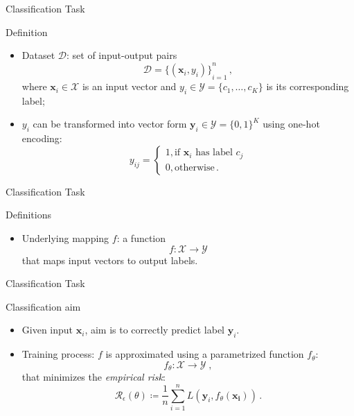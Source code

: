 \begin{frame}{Classification Task}
    \begin{definitionblock}{Definition}
        \centering
        \begin{itemize}
            \item<1-> Dataset $\mathcal{D}$: set of input-output pairs
            \[
                \mathcal{D} = {\{(\mathbf{x}_i, y_i)\}}_{i=1}^n\,,
            \]
            where $\mathbf{x}_i \in \mathcal{X}$ is an input vector and $y_i\in \mathcal{Y} = \{c_1, \dots, c_K\}$ is its corresponding label;
            \item<2-> $y_i$ can be transformed into vector form $\mathbf{y}_i\in \mathcal{Y} = {\{0,1\}}^K$ using one-hot encoding:
            \[
                y_{ij} = 
                \begin{cases}
                    1, \text{if $\mathbf{x}_i$ has label $c_j$}\\
                    0, \text{otherwise}\,.
                \end{cases}
            \]
        \end{itemize}
    \end{definitionblock}
\end{frame}

\begin{frame}{Classification Task}
    \begin{definitionblock}{Definitions}
        \centering
        \begin{itemize}
            \item<1-> Underlying mapping $f$: a function
            \[
                f:\mathcal{X} \to \mathcal{Y}
            \]
            that maps input vectors to output labels.
        \end{itemize}
    \end{definitionblock}
\end{frame}

\begin{frame}{Classification Task}
    \begin{normalblock}{Classification aim}
        \centering
        \begin{itemize}
            \item<1-> Given input $\mathbf{x}_i$, aim is to correctly predict label $\mathbf{y}_i$.
            \item<2-> Training process: $f$ is approximated using a parametrized function $f_{\theta}$:
            \[
                f_{\theta}: \mathcal{X} \to \mathcal{Y}\;,
            \]
            that minimizes the \emph{empirical risk}: 
            \[
                \mathcal{R}_{\epsilon}(\theta) \coloneqq \frac{1}{n}\sum_{i=1}^{n} L(\mathbf{y}_i,f_{\theta}(\mathbf{x_i}))\,.
            \]
        \end{itemize}
    \end{normalblock}
\end{frame}

